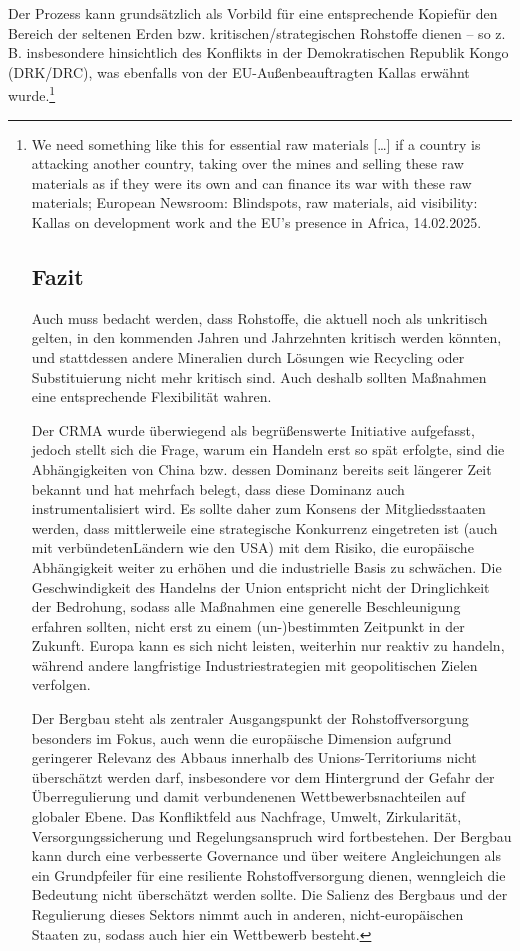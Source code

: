 \documentclass[12pt,a4paper,oneside]{book} %
\begin{document}
Der Prozess kann grundsätzlich als Vorbild für eine entsprechende \glqq Kopie\grqq für den Bereich der seltenen Erden bzw. kritischen/strategischen Rohstoffe dienen -- so z. B. insbesondere hinsichtlich des Konflikts in der Demokratischen Republik Kongo (DRK/DRC), was ebenfalls von der EU-Außenbeauftragten Kallas erwähnt wurde.\footnote{\glqq We need something like this for essential raw materials […] if a country is attacking another country, taking over the mines and selling these raw materials as if they were its own and can finance its war with these raw materials\grqq; European Newsroom: Blindspots, raw materials, aid visibility: Kallas on development work and the EU’s presence in Africa, 14.02.2025. %


\section{Fazit}

Auch muss bedacht werden, dass Rohstoffe, die aktuell noch als unkritisch gelten, in den kommenden Jahren und Jahrzehnten kritisch werden könnten, und stattdessen andere Mineralien durch Lösungen wie Recycling oder Substituierung nicht mehr kritisch sind. Auch deshalb sollten Maßnahmen eine entsprechende Flexibilität wahren.

Der CRMA wurde überwiegend als begrüßenswerte Initiative aufgefasst, jedoch stellt sich die Frage, warum ein Handeln erst so spät erfolgte, sind die Abhängigkeiten von China bzw. dessen Dominanz bereits seit längerer Zeit bekannt und hat mehrfach belegt, dass diese Dominanz auch instrumentalisiert wird. Es sollte daher zum Konsens der Mitgliedsstaaten werden, dass mittlerweile eine strategische Konkurrenz eingetreten ist (auch mit \glqq verbündeten\grqq Ländern wie den USA) mit dem Risiko, die europäische Abhängigkeit weiter zu erhöhen und die industrielle Basis zu schwächen. Die Geschwindigkeit des Handelns der Union entspricht nicht der Dringlichkeit der Bedrohung, sodass alle Maßnahmen eine generelle Beschleunigung erfahren sollten, nicht erst zu einem (un-)bestimmten Zeitpunkt in der Zukunft. Europa kann es sich nicht leisten, weiterhin nur reaktiv zu handeln, während andere langfristige Industriestrategien mit geopolitischen Zielen verfolgen.


Der Bergbau steht als zentraler Ausgangspunkt der Rohstoffversorgung besonders im Fokus, auch wenn die europäische Dimension aufgrund geringerer Relevanz des Abbaus innerhalb des Unions-Territoriums nicht überschätzt werden darf, insbesondere vor dem Hintergrund der Gefahr der Überregulierung und damit verbundenenen Wettbewerbsnachteilen auf globaler Ebene. Das Konfliktfeld aus Nachfrage, Umwelt, Zirkularität, Versorgungssicherung und Regelungsanspruch wird fortbestehen. Der Bergbau kann durch eine verbesserte Governance und über weitere Angleichungen als ein Grundpfeiler für eine resiliente Rohstoffversorgung dienen, wenngleich die Bedeutung nicht überschätzt werden sollte. Die Salienz des Bergbaus und der Regulierung dieses Sektors nimmt auch in anderen, nicht-europäischen Staaten zu, sodass auch hier ein Wettbewerb besteht.

}
\end{document}
